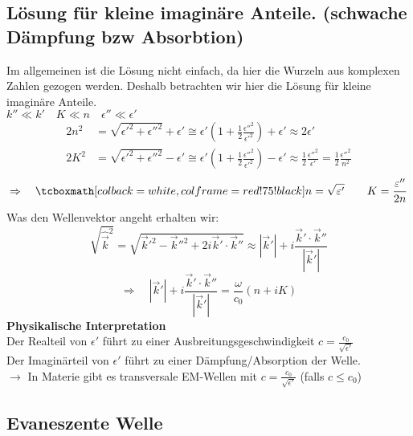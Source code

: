\subsection{Lösung für kleine imaginäre Anteile. (schwache Dämpfung bzw Absorbtion)}

Im allgemeinen ist die Lösung nicht einfach, da hier die Wurzeln aus komplexen Zahlen gezogen werden. Deshalb betrachten wir hier die Lösung für kleine imaginäre Anteile.\\
$ k'' \ll k' \quad K \ll n \quad \epsilon'' \ll \epsilon' $
\begin{align*}
2n^2 &= \sqrt{\epsilon'^2 + \epsilon''^2} + \epsilon' \cong \epsilon' \left(1 + \frac{1}{2} \frac{\epsilon''^2}{\epsilon'^2}\right) + \epsilon' \approx 2 \epsilon' \\
2K^2 &= \sqrt{\epsilon'^2 + \epsilon''^2} - \epsilon' \cong \epsilon' \left(1 + \frac{1}{2} \frac{\epsilon''^2}{\epsilon'^2}\right) - \epsilon' \approx \frac{1}{2} \frac{\epsilon''^2}{\epsilon'} = \frac{1}{2} \frac{\epsilon''^2}{n^2}
\end{align*}
\begin{equation*}
\Rightarrow \quad \rmbox{n = \sqrt{\epsilon'} \qquad K = \frac{\epsilon''}{2n}}
\end{equation*}
Was den Wellenvektor angeht erhalten wir:
\begin{equation*}
\sqrt{\hat{\vec{k}}^2} = \sqrt{\vec{k}'^2 - \vec{k}''^2 + 2 i \vec{k}' \cdot \vec{k}''} \approx | \vec{k}' | + i \frac{\vec{k}' \cdot \vec{k}''}{|\vec{k}'|}
\end{equation*}
\begin{equation*}
\Rightarrow \quad |\vec{k}'|  + i \frac{\vec{k}' \cdot \vec{k}''}{|\vec{k}'|} = \frac{\omega}{c_0} (n + i K)
\end{equation*}
\textbf{Physikalische Interpretation}\\[5pt]
Der Realteil von $\epsilon'$ führt zu einer Ausbreitungsgeschwindigkeit $ c = \frac{c_0}{\sqrt{\epsilon'}} $\\
Der Imaginärteil von $\epsilon'$ führt zu einer Dämpfung/Absorption der Welle.\\
$\rightarrow$ In Materie gibt es transversale EM-Wellen mit $ c = \frac{c_0}{\sqrt{\epsilon'}}$ (falls $c\leq c_0$)


\subsection{Evaneszente Welle}

